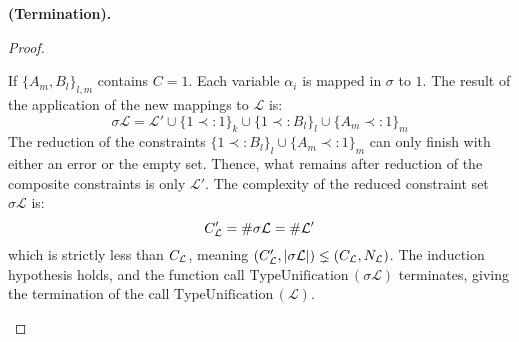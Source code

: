 \begin{thm}{\bf (Termination).}
\begin{proof}
\begin{itemize}
				If $\{A_m, B_l\}_{l, m}$ contains $C = 1$. Each variable $\alpha_i$ is mapped in $\sigma$ to $1$.
				The result of the application of the new mappings to $\mathcal{L}$ is:
			  	$$\sigma \mathcal{L} = \mathcal{L'} \cup \{1 \prec: 1\}_k \cup \{ 1 \prec: B_l \}_l \cup \{ A_m \prec: 1 \}_m$$
       	The reduction of the constraints $\{ 1 \prec: B_l \}_l \cup \{ A_m \prec: 1 \}_m$ can only finish with either an error or the empty set.
       	Thence, what remains after reduction of the composite constraints is only $\mathcal{L'}$.
       	The complexity of the reduced constraint set $\sigma \mathcal{L}$ is:
			  	$$C_{\mathcal{L}}' = \#\sigma\mathcal{L} = \#\mathcal{L'} $$
			  which is strictly less than $C_{\mathcal{L}}$, meaning $(C_{\mathcal{L}}',|\sigma\mathcal{L}|) \lneq (C_{\mathcal{L}}, N_{\mathcal{L}})$.
			  The induction hypothesis holds, and the function call $\text{TypeUnification}\,(\sigma \mathcal{L})$ terminates,
			  giving the termination of the call $\text{TypeUnification}\,(\mathcal{L})$. \\
							

\end{itemize}
\end{proof}
\end{thm}

